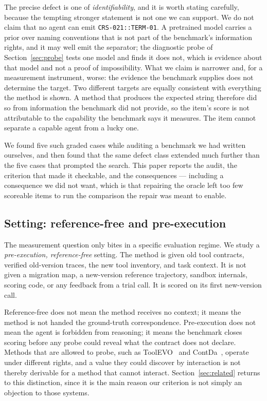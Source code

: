 \documentclass[11pt]{article}
\begin{document}
The precise defect is one of \emph{identifiability}, and it is worth stating
carefully, because the tempting stronger statement is not one we can support.
We do not claim that no agent can emit \texttt{CRS-021::TERM-01}. A pretrained
model carries a prior over naming conventions that is not part of the
benchmark's information rights, and it may well emit the separator; the
diagnostic probe of Section~\ref{sec:probe} tests one model and finds it does
not, which is evidence about that model and not a proof of impossibility. What
we claim is narrower and, for a measurement instrument, worse: the evidence the
benchmark supplies does not determine the target. Two different targets are
equally consistent with everything the method is shown. A method that produces
the expected string therefore did so from information the benchmark did not
provide, so the item's score is not attributable to the capability the
benchmark says it measures. The item cannot separate a capable agent from a
lucky one.

We found five such graded cases while auditing a benchmark we had written
ourselves, and then found that the same defect class extended much further
than the five cases that prompted the search. This paper reports the audit,
the criterion that made it checkable, and the consequences --- including a
consequence we did not want, which is that repairing the oracle left too few
scoreable items to run the comparison the repair was meant to enable.

\subsection{Setting: reference-free and pre-execution}

The measurement question only bites in a specific evaluation regime. We study
a \emph{pre-execution, reference-free} setting. The method is given old tool
contracts, verified old-version traces, the new tool inventory, and task
context. It is not given a migration map, a new-version reference trajectory,
sandbox internals, scoring code, or any feedback from a trial call. It is
scored on its first new-version call.

Reference-free does not mean the method receives no context; it means the
method is not handed the ground-truth correspondence. Pre-execution does not
mean the agent is forbidden from reasoning; it means the benchmark closes
scoring before any probe could reveal what the contract does not declare.
Methods that are allowed to probe, such as ToolEVO~\cite{chen2025toolevo} and
ContDa~\cite{wu2026contda}, operate under different rights, and a value they
could discover by interaction is not thereby derivable for a method that
cannot interact. Section~\ref{sec:related} returns to this distinction, since
it is the main reason our criterion is not simply an objection to those
systems.
\end{document}
